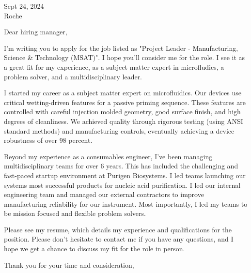 \documentclass[a4paper, 10pt]{letter}
\begin{document}
\begin{letter}
{
    Sept 24, 2024\\
    Roche\\
}

\opening{Dear hiring manager,}

I'm writing you to apply for the job listed as "Project Leader - Manufacturing, Science \& Technology (MSAT)". I hope you'll consider
me for the role. I see it as a great fit for my experience, as a subject matter expert in microfludics, a problem solver, and a 
multidisciplinary leader. 

I started my career as a subject matter expert on microfluidics. Our devices use critical wetting-driven features for a passive priming sequence. 
These features are controlled with careful injection molded geometry, good surface finish, and high degrees of cleanliness. 
We achieved quality through rigorous testing (using ANSI standard methods) and manufacturing controls, eventually achieving a device robustness of over 98 percent.

Beyond my experience as a consumables engineer, I've been managing multidisciplinary teams for over 6 years. This has included the challenging 
and fast-paced startup environment at Purigen Biosystems. I led teams launching our systems most successful products for nucleic acid purification. I led 
our internal engineering team and managed our external contractors to improve manufacturing reliability for our instrument. Most importantly, I led my 
teams to be mission focused and flexible problem solvers. 

Please see my resume, which details my experience and qualifications for the position. Please don't hesitate to contact me if you have any questions, and I hope we 
get a chance to discuss my fit for the role in person. 

\closing{Thank you for your time and consideration,}

\end{letter}
\end{document}
